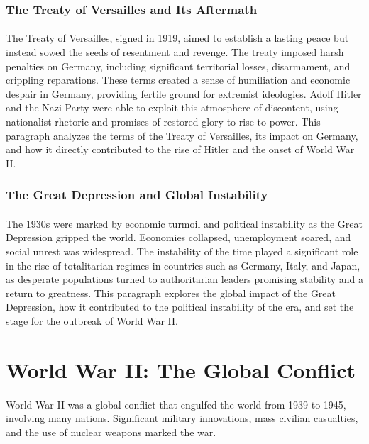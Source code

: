 \documentclass[a4paper,12pt]{book}
\begin{document}
\subsubsection*{The Treaty of Versailles and Its Aftermath}
\paragraph{}
The Treaty of Versailles, signed in 1919, aimed to establish a lasting peace but instead sowed the seeds of resentment and revenge. The treaty imposed harsh penalties on Germany, including significant territorial losses, disarmament, and crippling reparations. These terms created a sense of humiliation and economic despair in Germany, providing fertile ground for extremist ideologies. Adolf Hitler and the Nazi Party were able to exploit this atmosphere of discontent, using nationalist rhetoric and promises of restored glory to rise to power. This paragraph analyzes the terms of the Treaty of Versailles, its impact on Germany, and how it directly contributed to the rise of Hitler and the onset of World War II.

\subsubsection*{The Great Depression and Global Instability}
\paragraph{}
The 1930s were marked by economic turmoil and political instability as the Great Depression gripped the world. Economies collapsed, unemployment soared, and social unrest was widespread. The instability of the time played a significant role in the rise of totalitarian regimes in countries such as Germany, Italy, and Japan, as desperate populations turned to authoritarian leaders promising stability and a return to greatness. This paragraph explores the global impact of the Great Depression, how it contributed to the political instability of the era, and set the stage for the outbreak of World War II.

\section*{World War II: The Global Conflict}
\paragraph{}
World War II was a global conflict that engulfed the world from 1939 to 1945, involving many nations. Significant military innovations, mass civilian casualties, and the use of nuclear weapons marked the war.
\end{document}
